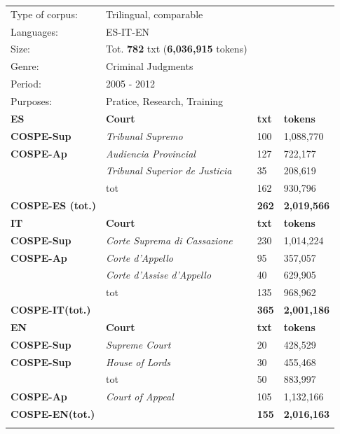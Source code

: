\documentclass[output=paper]{LSP/langsci}
\begin{document}
\begin{table}
     \centering
     \begin{tabular}{llll}
     \lsptoprule
Type of corpus: & Trilingual, comparable && \\
Languages: & ES-IT-EN && \\
Size: & Tot. \textbf{782} txt (\textbf{6,036,915} tokens) && \\
Genre: & Criminal Judgments && \\
Period: & 2005 - 2012 && \\
Purposes: & Pratice, Research, Training   && \\
     \lsptoprule
       \textbf{ES}  & \textbf{Court}       & \textbf{txt}  &  \textbf{tokens} \\ \midrule
       \textbf{COSPE-Sup}    & \textit{Tribunal Supremo}          & 100				& 1,088,770\\
       \textbf{COSPE-Ap}       & \textit{Audiencia Provincial}    & 127				& 722,177\\
                     & \textit{Tribunal Superior de Justicia}      & 35				& 208,619\\
                      & tot             & 162				& 930,796\\ \midrule
       \textbf{COSPE-ES (tot.)}    &              & \textbf{262}				& \textbf{2,019,566}\\ 

\lspbottomrule
       \textbf{IT}  & \textbf{Court}       & \textbf{txt}  & \textbf{tokens} \\ \midrule
       \textbf{COSPE-Sup}    & \textit{Corte Suprema di Cassazione}             & 230				& 1,014,224\\
       \textbf{COSPE-Ap}       & \textit{Corte d’Appello}             & 95				& 357,057\\
                     & \textit{Corte d’Assise d’Appello}             & 40				& 629,905\\
                      & tot             & 135				& 968,962\\ \hline
       \textbf{COSPE-IT(tot.)}   &    &     \textbf{365}				& \textbf{2,001,186}\\  
\lspbottomrule

       \textbf{EN}  & \textbf{Court}       & \textbf{txt}  & \textbf{tokens} \\ \midrule
       \textbf{COSPE-Sup}    & \textit{Supreme Court}             & 20				& 428,529\\
       \textbf{COSPE-Sup}       & \textit{House of Lords}         & 30				& 455,468\\
                                & tot     & 50				& 883,997\\
       \textbf{COSPE-Ap}  & \textit{Court of Appeal} & 105				& 1,132,166\\ \midrule
       \textbf{COSPE-EN(tot.)}   &    &     \textbf{155}				& \textbf{2,016,163}\\  
\lspbottomrule
\end{tabular}
 

\end{table}
\end{document}
